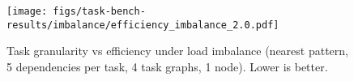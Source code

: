 \begin{figure}[t]

\centering
\texttt{[image: figs/task-bench-results/imbalance/efficiency\_imbalance\_2.0.pdf]}

\vspace{-0.15cm}
\caption{Task granularity vs efficiency under load imbalance (nearest pattern, 5 dependencies per task, 4 task graphs, 1 node). Lower is better.\label{fig:efficiency-imbalance}}
\vspace{-0.1cm}
\end{figure}
